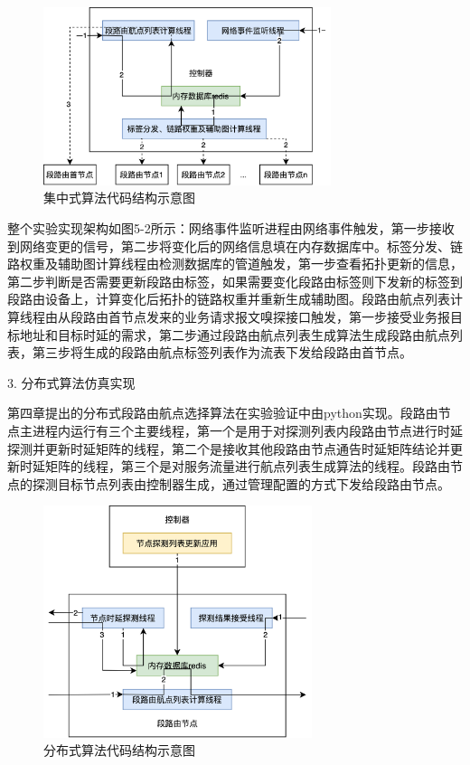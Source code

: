 \begin{figure}[htbp]
\setlength{\abovecaptionskip}{15pt plus 3pt minus 2pt}
\centerline{\includegraphics[width=0.75\textwidth]{./figures/ch3-test-code.png}}
\caption{集中式算法代码结构示意图}
\label{fig-ch3-test-code}
\end{figure}

整个实验实现架构如图5-2所示：网络事件监听进程由网络事件触发，第一步接收到网络变更的信号，第二步将变化后的网络信息填在内存数据库中。标签分发、链路权重及辅助图计算线程由检测数据库的管道触发，第一步查看拓扑更新的信息，第二步判断是否需要更新段路由标签，如果需要变化段路由标签则下发新的标签到段路由设备上，计算变化后拓扑的链路权重并重新生成辅助图。段路由航点列表计算线程由从段路由首节点发来的业务请求报文嗅探接口触发，第一步接受业务报目标地址和目标时延的需求，第二步通过段路由航点列表生成算法生成段路由航点列表，第三步将生成的段路由航点标签列表作为流表下发给段路由首节点。

3. 分布式算法仿真实现

第四章提出的分布式段路由航点选择算法在实验验证中由python实现。段路由节点主进程内运行有三个主要线程，第一个是用于对探测列表内段路由节点进行时延探测并更新时延矩阵的线程，第二个是接收其他段路由节点通告时延矩阵结论并更新时延矩阵的线程，第三个是对服务流量进行航点列表生成算法的线程。段路由节点的探测目标节点列表由控制器生成，通过管理配置的方式下发给段路由节点。

\begin{figure}[htbp]
\setlength{\abovecaptionskip}{15pt plus 3pt minus 2pt}
\centerline{\includegraphics[width=0.7\textwidth]{./figures/ch4-test-code.png}}
\caption{分布式算法代码结构示意图}
\label{fig-ch4-test-code}
\end{figure}

